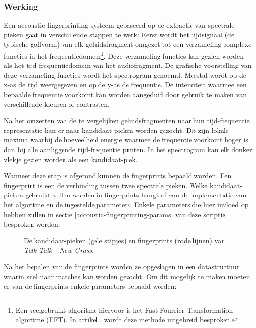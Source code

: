 \subsubsection{Werking}

Een accoustic fingerprinting systeem gebaseerd op de extractie van spectrale pieken gaat in verschillende stappen te werk: 
Eerst wordt het tijdsignaal (de typische golfvorm) van elk geluidsfragment omgezet tot een verzameling complexe functies in het frequentiedomein\footnote{Een veelgebruikt algoritme hiervoor is het Fast Fourrier Transformation algoritme (FFT). In artikel \cite{oppenheim1970speech}. wordt deze methode uitgebreid besproken.}. Deze verzameling functies kan gezien worden als het tijd-frequentiedomein van het audiofragment. De grafische voorstelling van deze verzameling functies wordt het spectrogram genoemd. Meestal wordt op de x-as de tijd weergegeven en op de y-as de frequentie. De intensiteit waarmee een bepaalde frequentie voorkomt kan worden aangeduid door gebruik te maken van verschillende kleuren of contrasten. 

Na het omzetten van de te vergelijken geluidsfragmenten naar hun tijd-frequentie representatie kan er naar kandidaat-pieken worden gezocht. Dit zijn lokale maxima waarbij de hoeveelheid energie waarmee de frequentie voorkomt hoger is dan bij alle aanliggende tijd-frequentie punten\cite{six2014panako}. In het spectrogram kan elk donker vlekje gezien worden als een kandidaat-piek.

Wanneer deze stap is afgerond kunnen de fingerprints bepaald worden. Een fingerprint is een de verbinding tussen twee spectrale pieken. Welke kandidaat-pieken gebruikt zullen worden in fingerprints hangt af van de implementatie van het algoritme en de ingestelde parameters. Enkele parameters die hier invloed op hebben zullen in sectie \ref{accoustic-fingerprinting-params} van deze scriptie besproken worden.

\begin{figure}[h!]
	\captionsetup{width=0.7\textwidth}
	\caption[Kandidaat-pieken en fingerprints]{De kandidaat-pieken (gele stipjes) en fingerprints (rode lijnen)  van \textit{Talk Talk - New Grass}.}
	\begin{center}
		\advance\parskip0.3cm
		
	\end{center}
\end{figure}

Na het bepalen van de fingerprints worden ze opgeslagen in een datastructuur waarin snel naar matches kan worden gezocht.
Om dit mogelijk te maken moeten er van de fingerprints enkele parameters bepaald worden:

